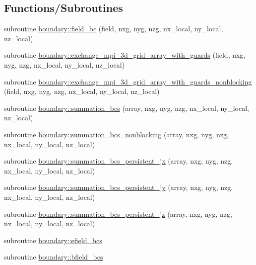 \subsection*{Functions/\+Subroutines}
\begin{DoxyCompactItemize}
\item 
subroutine \hyperlink{namespaceboundary_aaf2c39f38c9f0330fd2501f49ef34b7d}{boundary\+::field\+\_\+bc} (field, nxg, nyg, nzg, nx\+\_\+local, ny\+\_\+local, nz\+\_\+local)
\item 
subroutine \hyperlink{namespaceboundary_a7fcd1d8e118d647057f0523af107674e}{boundary\+::exchange\+\_\+mpi\+\_\+3d\+\_\+grid\+\_\+array\+\_\+with\+\_\+guards} (field, nxg, nyg, nzg,                                               nx\+\_\+local, ny\+\_\+local, nz\+\_\+local)
\item 
subroutine \hyperlink{namespaceboundary_a4e895aead34d40e905893ad3a0ee3d32}{boundary\+::exchange\+\_\+mpi\+\_\+3d\+\_\+grid\+\_\+array\+\_\+with\+\_\+guards\+\_\+nonblocking} (field, nxg, nyg, nzg,                                               nx\+\_\+local, ny\+\_\+local, nz\+\_\+local)
\item 
subroutine \hyperlink{namespaceboundary_ad298755064359a32a3e7d89b376329cf}{boundary\+::summation\+\_\+bcs} (array, nxg, nyg, nzg, nx\+\_\+local, ny\+\_\+local, nz\+\_\+local)
\item 
subroutine \hyperlink{namespaceboundary_a1ad86bf436bc91d3210fdf0f6d86ab1f}{boundary\+::summation\+\_\+bcs\+\_\+nonblocking} (array, nxg, nyg, nzg, nx\+\_\+local, ny\+\_\+local, nz\+\_\+local)
\item 
subroutine \hyperlink{namespaceboundary_ac7114eb91bced14ba975f1467fb2db08}{boundary\+::summation\+\_\+bcs\+\_\+persistent\+\_\+jx} (array, nxg, nyg, nzg, nx\+\_\+local, ny\+\_\+local, nz\+\_\+local)
\item 
subroutine \hyperlink{namespaceboundary_ac7a1a01d802cba6dd53260db0cb76a93}{boundary\+::summation\+\_\+bcs\+\_\+persistent\+\_\+jy} (array, nxg, nyg, nzg, nx\+\_\+local, ny\+\_\+local, nz\+\_\+local)
\item 
subroutine \hyperlink{namespaceboundary_ad2325e9a68255f71d1cafcee47b1ff9a}{boundary\+::summation\+\_\+bcs\+\_\+persistent\+\_\+jz} (array, nxg, nyg, nzg, nx\+\_\+local, ny\+\_\+local, nz\+\_\+local)
\item 
subroutine \hyperlink{namespaceboundary_a2397a80ea9511ae3266ad16c668cc547}{boundary\+::efield\+\_\+bcs}
\item 
subroutine \hyperlink{namespaceboundary_af2316f12b3b85debc7214c4c47035322}{boundary\+::bfield\+\_\+bcs}

\end{DoxyCompactItemize}
